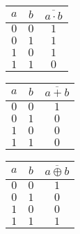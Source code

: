 \begin{Row}
	\begin{Cell}{1}
		\centering
		\begin{tabular}{cc|c}
			\toprule
			$a$ & $b$ & $\overline{a\cdot b}$ \\
			\midrule
			$0$ & $0$ & $1$                   \\
			$0$ & $1$ & $1$                   \\
			$1$ & $0$ & $1$                   \\
			$1$ & $1$ & $0$                   \\
			\bottomrule
		\end{tabular}
		\vspace{1ex}
	\end{Cell}
	\begin{Cell}{1}
		\centering
		\begin{tabular}{cc|c}
			\toprule
			$a$ & $b$ & $\overline{a+b}$ \\
			\midrule
			$0$ & $0$ & $1$              \\
			$0$ & $1$ & $0$              \\
			$1$ & $0$ & $0$              \\
			$1$ & $1$ & $0$              \\
			\bottomrule
		\end{tabular}
		\vspace{1ex}
	\end{Cell}
	\begin{Cell}{1}
		\centering
		\begin{tabular}{cc|c}
			\toprule
			$a$ & $b$ & $\overline{a \oplus b}$ \\
			\midrule
			$0$ & $0$ & $1$                     \\
			$0$ & $1$ & $0$                     \\
			$1$ & $0$ & $0$                     \\
			$1$ & $1$ & $1$                     \\
			\bottomrule
		\end{tabular}
		\vspace{1ex}
	\end{Cell}
	\begin{Cell}{1}
		\phantom{x}
	\end{Cell}
\end{Row}

